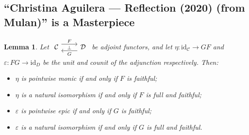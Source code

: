 \documentclass[a4paper,11pt]{article}
\theoremstyle{break_italics}
\newtheorem*{lemma*}{Lemma}
\theoremstyle{break_upright}
\theoremstyle{remark}
\newcommand{\id}{\mathrm{id}}
\newcommand{\C}{\mathcal{C}}
\newcommand{\D}{\mathcal{D}}
\begin{document}
\subsection{``Christina Aguilera --- Reflection (2020) (from Mulan)'' is a Masterpiece}

\begin{lemma*}
Let $\begin{tikzcd}
	\C & \D
	\arrow["\bot"{description}, draw=none, from=1-1, to=1-2]
	\arrow["F", shift left=2, from=1-1, to=1-2]
	\arrow["G", shift left=2, from=1-2, to=1-1]
\end{tikzcd}$ be adjoint functors, and let $\eta \colon \id_\C \to GF$ and $\varepsilon \colon FG \to \id_D$ be the unit and counit of the adjunction respectively. Then:
\begin{itemize}
	\item $\eta$ is pointwise monic if and only if $F$ is faithful;
	\item $\eta$ is a natural isomorphism if and only if $F$ is full and faithful;
	\item $\varepsilon$ is pointwise epic if and only if $G$ is faithful;
	\item $\varepsilon$ is a natural isomorphism if and only if $G$ is full and faithful.
\end{itemize}
\end{lemma*}
\end{document}
